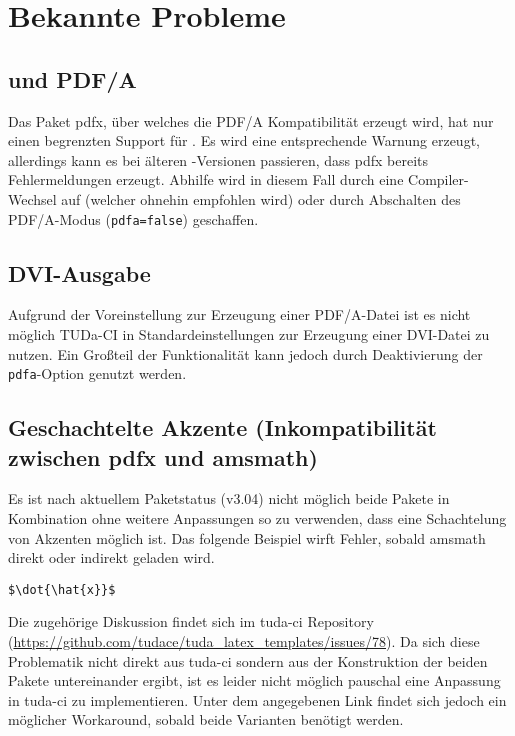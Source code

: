\documentclass[
	german,
	accentcolor=9c,%
	]{tudapub}
\let\code\texttt
\let\pck\textsf
\begin{document}
\section{Bekannte Probleme}

\subsection{\texorpdfstring{}{XeLaTeX} und PDF/A}
Das Paket \pck{pdfx}, über welches die PDF/A Kompatibilität erzeugt wird, hat nur einen begrenzten Support für .
Es wird eine entsprechende Warnung erzeugt, allerdings kann es bei älteren -Versionen passieren, dass \pck{pdfx} bereits Fehlermeldungen erzeugt. Abhilfe wird in diesem Fall durch eine Compiler-Wechsel auf  (welcher ohnehin empfohlen wird) oder durch Abschalten des PDF/A-Modus (\code{pdfa=false})  geschaffen.

\subsection{DVI-Ausgabe}
Aufgrund der Voreinstellung zur Erzeugung einer PDF/A-Datei ist es nicht möglich TUDa-CI in Standardeinstellungen zur Erzeugung einer DVI-Datei zu nutzen. Ein Großteil der Funktionalität kann jedoch durch Deaktivierung der \code{pdfa}-Option genutzt werden.


\subsection{Geschachtelte Akzente (Inkompatibilität zwischen pdfx und amsmath)}
Es ist nach aktuellem Paketstatus (v3.04) nicht möglich beide Pakete in Kombination ohne weitere Anpassungen so zu verwenden, dass eine Schachtelung von Akzenten möglich ist. Das folgende Beispiel wirft Fehler, sobald \pck{amsmath} direkt oder indirekt geladen wird.
\begin{verbatim}
$\dot{\hat{x}}$
\end{verbatim}

\noindent Die zugehörige Diskussion findet sich im tuda-ci Repository (\url{https://github.com/tudace/tuda_latex_templates/issues/78}). Da sich diese Problematik nicht direkt aus tuda-ci sondern aus der Konstruktion der beiden Pakete untereinander ergibt, ist es leider nicht möglich pauschal eine Anpassung in tuda-ci zu implementieren. Unter dem angegebenen Link findet sich jedoch ein möglicher Workaround, sobald beide Varianten benötigt werden.
\end{document}
